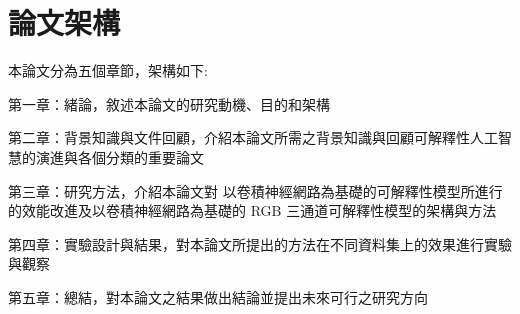\documentclass[class=NCU_thesis, crop=false]{standalone}
\begin{document}
\pagebreak
\section{論文架構}

本論文分為五個章節，架構如下:

第一章：緒論，敘述本論文的研究動機、目的和架構

第二章：背景知識與文件回顧，介紹本論文所需之背景知識與回顧可解釋性人工智慧的演進與各個分類的重要論文

第三章：研究方法，介紹本論文對 以卷積神經網路為基礎的可解釋性模型所進行的效能改進及以卷積神經網路為基礎的 RGB 三通道可解釋性模型的架構與方法

第四章：實驗設計與結果，對本論文所提出的方法在不同資料集上的效果進行實驗與觀察

第五章：總結，對本論文之結果做出結論並提出未來可行之研究方向
\end{document}
